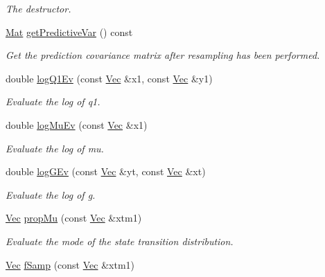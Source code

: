 \begin{DoxyCompactItemize}
\begin{DoxyCompactList}\small\item\em The destructor. \end{DoxyCompactList}\item 
\hyperlink{pmfs_8h_ae601f56a556993079f730483c574356f}{Mat} \hyperlink{classJacEtAlAPF_a568748b544f75aad1cf779216affc229}{get\+Predictive\+Var} () const 
\begin{DoxyCompactList}\small\item\em Get the prediction covariance matrix after resampling has been performed. \end{DoxyCompactList}\item 
double \hyperlink{classJacEtAlAPF_a36e56af90cafe323fc42d8eaf75402f9}{log\+Q1\+Ev} (const \hyperlink{pmfs_8h_a4c7df05c6f5e8a0d15ae14bcdbc07152}{Vec} \&x1, const \hyperlink{pmfs_8h_a4c7df05c6f5e8a0d15ae14bcdbc07152}{Vec} \&y1)
\begin{DoxyCompactList}\small\item\em Evaluate the log of q1. \end{DoxyCompactList}\item 
double \hyperlink{classJacEtAlAPF_ac61d6bcb7a63bc95fda6e138255c2535}{log\+Mu\+Ev} (const \hyperlink{pmfs_8h_a4c7df05c6f5e8a0d15ae14bcdbc07152}{Vec} \&x1)
\begin{DoxyCompactList}\small\item\em Evaluate the log of mu. \end{DoxyCompactList}\item 
double \hyperlink{classJacEtAlAPF_a0cd22a37063906eddf47f8b4887919eb}{log\+G\+Ev} (const \hyperlink{pmfs_8h_a4c7df05c6f5e8a0d15ae14bcdbc07152}{Vec} \&yt, const \hyperlink{pmfs_8h_a4c7df05c6f5e8a0d15ae14bcdbc07152}{Vec} \&xt)
\begin{DoxyCompactList}\small\item\em Evaluate the log of g. \end{DoxyCompactList}\item 
\hyperlink{pmfs_8h_a4c7df05c6f5e8a0d15ae14bcdbc07152}{Vec} \hyperlink{classJacEtAlAPF_a3066fe2bd0b399a85eaf51ecdb1c3660}{prop\+Mu} (const \hyperlink{pmfs_8h_a4c7df05c6f5e8a0d15ae14bcdbc07152}{Vec} \&xtm1)
\begin{DoxyCompactList}\small\item\em Evaluate the mode of the state transition distribution. \end{DoxyCompactList}\item 
\hyperlink{pmfs_8h_a4c7df05c6f5e8a0d15ae14bcdbc07152}{Vec} \hyperlink{classJacEtAlAPF_abb98b3c8dcb28b43bebf54c15e0f8616}{f\+Samp} (const \hyperlink{pmfs_8h_a4c7df05c6f5e8a0d15ae14bcdbc07152}{Vec} \&xtm1)

\end{DoxyCompactItemize}
